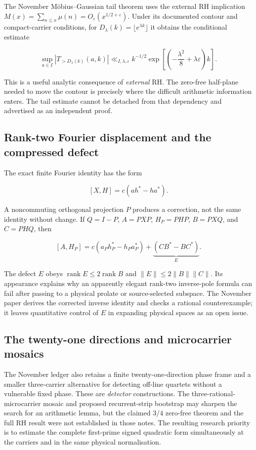 \documentclass[
  10pt,
  a4paper,
  10pt,
  oneside,
  openany]{book}
\begin{document}
The November Möbius--Gaussian tail theorem uses the external RH
implication
\(M(x)=\sum_{n\le x}\mu(n)=O_\varepsilon(x^{1/2+\varepsilon})\). Under
its documented contour and compact-carrier conditions, for
\(D_\lambda(k)=\lfloor e^{\lambda k}\rfloor\) it obtains the conditional
estimate

\[
\sup_{a\in I}|T_{>D_\lambda(k)}(a,k)|
\ll_{I,\lambda,\varepsilon}k^{-1/2}
\exp\!\left[\left(-\frac{\lambda^2}{8}
+\lambda\varepsilon\right)k\right].
\tag{S8.7}\label{eq:S8.7}
\]

This is a useful analytic consequence of \emph{external} RH. The
zero-free half-plane needed to move the contour is precisely where the
difficult arithmetic information enters. The tail estimate cannot be
detached from that dependency and advertised as an independent proof.

\subsection{Rank-two Fourier displacement and the compressed
defect}\label{rank-two-fourier-displacement-and-the-compressed-defect}

The exact finite Fourier identity has the form

\[
[X,H]=c(ah^*-ha^*).
\tag{S8.8}\label{eq:S8.8}
\]

A noncommuting orthogonal projection \(P\) produces a correction, not
the same identity without change. If \(Q=I-P\), \(A=PXP\), \(H_P=PHP\),
\(B=PXQ\), and \(C=PHQ\), then

\[
[A,H_P]
=c(a_Ph_P^*-h_Pa_P^*)
+\underbrace{(CB^*-BC^*)}_{E}.
\tag{S8.9}\label{eq:S8.9}
\]

The defect \(E\) obeys \(\operatorname{rank}E\le2\operatorname{rank}B\)
and \(\|E\|\le2\|B\|\|C\|\). Its appearance explains why an apparently
elegant rank-two inverse-pole formula can fail after passing to a
physical prolate or source-selected subspace. The November paper derives
the corrected inverse identity and checks a rational counterexample; it
leaves quantitative control of \(E\) in expanding physical spaces as an
open issue.

\subsection{The twenty-one directions and microcarrier
mosaics}\label{the-twenty-one-directions-and-microcarrier-mosaics}

The November ledger also retains a finite twenty-one-direction phase
frame and a smaller three-carrier alternative for detecting off-line
quartets without a vulnerable fixed phase. These are \emph{detector}
constructions. The three-rational-microcarrier mosaic and proposed
recurrent-strip bootstrap may sharpen the search for an arithmetic
lemma, but the claimed \(3/4\) zero-free theorem and the full RH result
were not established in those notes. The resulting research priority is
to estimate the complete first-prime signed quadratic form
simultaneously at the carriers and in the same physical normalisation.
\end{document}
